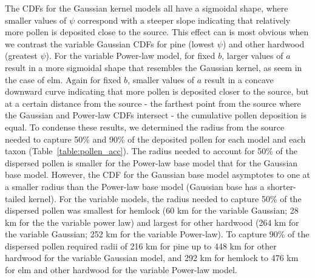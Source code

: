 \documentclass[12pt]{article}
\begin{document}
The CDFs for the Gaussian kernel models all have a sigmoidal shape,
where smaller values of $\psi$ correspond with a steeper slope
indicating that relatively more pollen is deposited close to the
source. This effect can is most obvious when we contrast the variable
Gaussian CDFs for pine (lowest $\psi$) and other hardwood (greatest
$\psi$). For the variable Power-law model, for fixed $b$, larger
values of $a$ result in a more sigmoidal shape that resembles the
Gaussian kernel, as seem in the case of elm. Again for fixed $b$,
smaller values of $a$ result in a concave downward curve indicating
that more pollen is deposited closer to the source, but at a certain
distance from the source - the farthest point from the source where
the Gaussian and Power-law CDFs intersect - the cumulative pollen
deposition is equal. To condense these results, we determined the
radius from the source needed to capture 50\% and 90\% of the
deposited pollen for each model and each taxon
(Table~\ref{table:pollen_acc}). The radius needed to account for 50\%
of the dispersed pollen is smaller for the Power-law base model that
for the Gaussian base model. However, the CDF for the Gaussian base
model asymptotes to one at a smaller radius than the Power-law base
model (Gaussian base has a shorter-tailed kernel). For the variable
models, the radius needed to capture 50\% of the dispersed pollen was
smallest for hemlock (60 km for the variable Gaussian; 28 km for the
the variable power law) and largest for other hardwood (264 km for the
variable Gaussian; 252 km for the variable Power-law). To capture 90\%
of the dispersed pollen required radii of 216 km for pine up to 448 km
for other hardwood for the variable Gaussian model, and 292 km for
hemlock to 476 km for elm and other hardwood for the variable
Power-law model.

\end{document}
